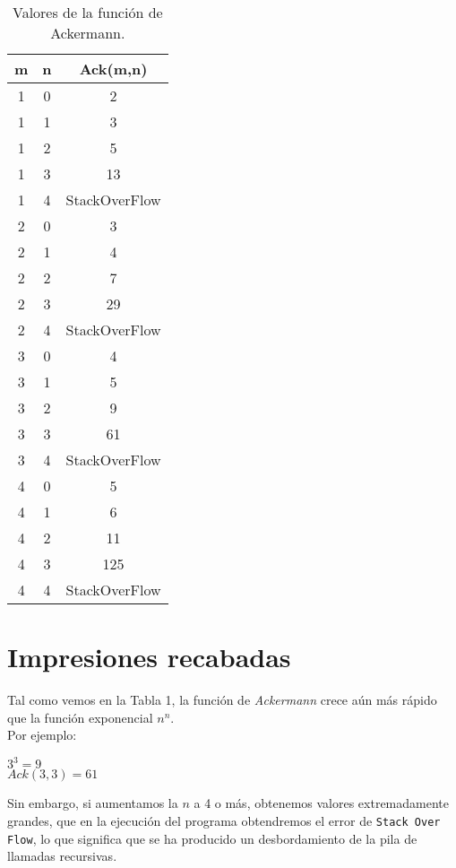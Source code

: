 \documentclass[12pt,letterpaper]{article}
\begin{document}
\begin{center}
\begin{table}[htbp]
	\begin{center}
		\begin{tabular}{|c|c|c|}
			\hline
			\textbf{m} & \textbf{n} & \textbf{Ack(m,n)}  \\
			\hline 
			1 & 0 & 2\\ \hline	
			1 & 1 & 3\\ \hline	
			1 & 2 & 5\\ \hline	
			1 & 3 & 13\\ \hline	
			1 & 4 & StackOverFlow\\ \hline	
			2 & 0 & 3\\ \hline	
			2 & 1 & 4\\ \hline	
			2 & 2 & 7\\ \hline	
			2 & 3 & 29\\ \hline	
			2 & 4 & StackOverFlow\\ \hline	
			3 & 0 & 4\\ \hline	
			3 & 1 & 5\\ \hline	
			3 & 2 & 9\\ \hline
			3 & 3 & 61\\ \hline
			3 & 4 & StackOverFlow\\ \hline
			4 & 0 & 5\\ \hline
			4 & 1 & 6\\ \hline
			4 & 2 & 11\\ \hline
			4 & 3 & 125\\ \hline
			4 & 4 & StackOverFlow\\ \hline
		\end{tabular}
		\caption{Valores de la función de Ackermann.}
		\label{tabla:Valores de la función de Ackermann}
	\end{center}
\end{table}
\end{center}

\section{Impresiones recabadas}
\noindent
Tal como vemos en la Tabla 1, la función de \textit{Ackermann} crece aún más rápido que la función exponencial $n^n$.\\
Por ejemplo:
\begin{center}
	$3^3=9$\\
	$Ack(3,3)=61$
\end{center}
Sin embargo, si aumentamos la $n$ a 4 o más, obtenemos valores extremadamente grandes, que en la ejecución del programa obtendremos el error de \texttt{Stack Over Flow}, lo que significa que se ha producido un desbordamiento de la pila de llamadas recursivas.
\end{document}
